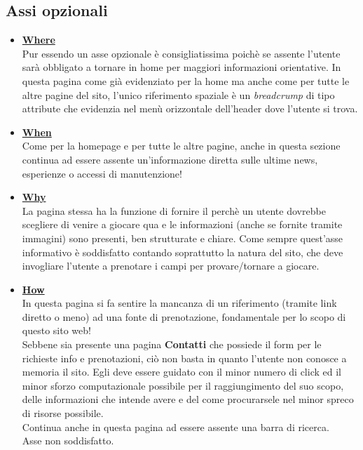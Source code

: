 \documentclass[../Relazione.tex]{subfiles}
\begin{document}
    \subsection{Assi opzionali}
        \vspace*{0,5cm}
        \begin{itemize}
            \item \textbf{\underline{Where}}
            \vspace*{5mm}\\Pur essendo un asse opzionale è consigliatissima poichè se assente l'utente sarà obbligato a tornare in home per maggiori informazioni orientative.
            In questa pagina come già evidenziato per la home ma anche come per tutte le altre pagine del sito, l'unico riferimento spaziale è un \emph{breadcrump} di tipo attribute che evidenzia nel menù orizzontale dell'header dove l'utente si trova.
            \item \textbf{\underline{When}}
            \vspace*{5mm}\\Come per la homepage e per tutte le altre pagine, anche in questa sezione continua ad essere assente un'informazione diretta sulle ultime news, esperienze o accessi di manutenzione!
            \item \textbf{\underline{Why}}
            \vspace*{5mm}\\La pagina stessa ha la funzione di fornire il perchè un utente dovrebbe scegliere di venire a giocare qua e le informazioni (anche se fornite tramite immagini) sono presenti, ben strutturate e chiare. Come sempre quest'asse informativo è soddisfatto contando soprattutto la natura del sito, che deve invogliare l'utente a prenotare i campi per provare/tornare a giocare.
            \item \textbf{\underline{How}}
            \vspace*{5mm}\\In questa pagina si fa sentire la mancanza di un riferimento (tramite link diretto o meno) ad una fonte di prenotazione, fondamentale per lo scopo di questo sito web!\\
            Sebbene sia presente una pagina \textbf{Contatti} che possiede il form per le richieste info e prenotazioni, ciò non basta in quanto l'utente non conosce a memoria il sito. Egli deve essere guidato con il minor numero di click ed il minor sforzo computazionale possibile per il raggiungimento del suo scopo, delle informazioni che intende avere e del come procurarsele nel minor spreco di risorse possibile.\\
            Continua anche in questa pagina ad essere assente una barra di ricerca.\\
            Asse non soddisfatto.

        \end{itemize}
\end{document}
